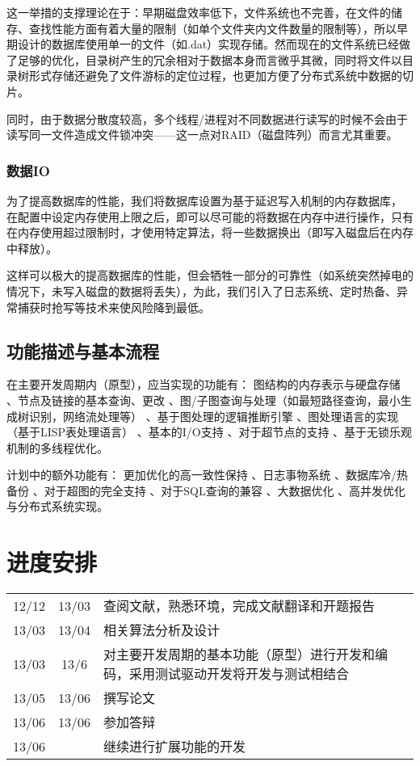 \documentclass[a4paper]{ecust_thesis_openning}
\begin{document}
			这一举措的支撑理论在于：早期磁盘效率低下，文件系统也不完善，在文件的储存、查找性能方面有着大量的限制（如单个文件夹内文件数量的限制等），所以早期设计的数据库使用单一的文件（如.dat）实现存储。然而现在的文件系统已经做了足够的优化，目录树产生的冗余相对于数据本身而言微乎其微，同时将文件以目录树形式存储还避免了文件游标的定位过程，也更加方便了分布式系统中数据的切片。
			
			同时，由于数据分散度较高，多个线程/进程对不同数据进行读写的时候不会由于读写同一文件造成文件锁冲突——这一点对RAID（磁盘阵列）而言尤其重要。
		\subsubsection{数据IO}
		为了提高数据库的性能，我们将数据库设置为基于延迟写入机制的内存数据库， 在配置中设定内存使用上限之后，即可以尽可能的将数据在内存中进行操作，只有在内存使用超过限制时，才使用特定算法，将一些数据换出（即写入磁盘后在内存中释放）。
		
		这样可以极大的提高数据库的性能，但会牺牲一部分的可靠性（如系统突然掉电的情况下，未写入磁盘的数据将丢失），为此，我们引入了日志系统、定时热备、异常捕获时抢写等技术来使风险降到最低。

	\subsection{功能描述与基本流程}
		在主要开发周期内（原型），应当实现的功能有： 图结构的内存表示与硬盘存储 、节点及链接的基本查询、更改 、图/子图查询与处理（如最短路径查询，最小生成树识别，网络流处理等） 、基于图处理的逻辑推断引擎 、图处理语言的实现（基于LISP表处理语言） 、基本的I/O支持 、对于超节点的支持 、基于无锁乐观机制的多线程优化。

		计划中的额外功能有： 更加优化的高一致性保持 、日志事物系统 、数据库冷/热备份 、对于超图的完全支持 、对于SQL查询的兼容 、大数据优化 、高并发优化与分布式系统实现。

\section{进度安排}
	\begin{center} \begin{tabular}[hbt]{c c p{}}
		12/12	&	13/03	&	查阅文献，熟悉环境，完成文献翻译和开题报告\\
		13/03	&	13/04  	&	相关算法分析及设计\\
		13/03	&	13/6  	&	对主要开发周期的基本功能（原型）进行开发和编码，采用测试驱动开发将开发与测试相结合\\
		13/05	&	13/06	&	撰写论文\\
		13/06	&	13/06  	&	参加答辩\\
		13/06	&		  	&	继续进行扩展功能的开发\\
\end{tabular} \end{center}
\end{document}
